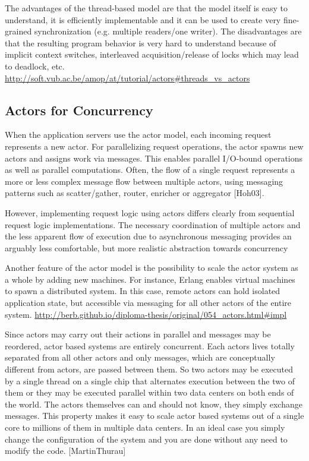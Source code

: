 The advantages of the thread-based model are that the model itself is easy to understand, it is efficiently implementable and it can be used to create very fine-grained synchronization (e.g. multiple readers/one writer). The disadvantages are that the resulting program behavior is very hard to understand because of implicit context switches, interleaved acquisition/release of locks which may lead to deadlock, etc. \url{http://soft.vub.ac.be/amop/at/tutorial/actors#threads_vs_actors}

\subsection{Actors for Concurrency}
When the application servers use the actor model, each incoming request represents a new actor. For parallelizing request operations, the actor spawns new actors and assigns work via messages. This enables parallel I/O-bound operations as well as parallel computations. Often, the flow of a single request represents a more or less complex message flow between multiple actors, using messaging patterns such as scatter/gather, router, enricher or aggregator [Hoh03].

However, implementing request logic using actors differs clearly from sequential request logic implementations. The necessary coordination of multiple actors and the less apparent flow of execution due to asynchronous messaging provides an arguably less comfortable, but more realistic abstraction towards concurrency

Another feature of the actor model is the possibility to scale the actor system as a whole by adding new machines. For instance, Erlang enables virtual machines to spawn a distributed system. In this case, remote actors can hold isolated application state, but accessible via messaging for all other actors of the entire system. \url{http://berb.github.io/diploma-thesis/original/054_actors.html#impl}

Since actors may carry out their actions in parallel and messages may be reordered, actor based systems are entirely concurrent. Each actors lives totally separated from all other actors and only messages, which are conceptually different from actors, are passed between them. So two actors may be executed by a single thread on a single chip that alternates execution between the two of them or they may be executed parallel within two data centers on both ends of the world. The actors themselves can and should not know, they simply exchange messages. This property makes it easy to scale actor based systems out of a single core to millions of them in multiple data centers. In an ideal case you simply change the configuration of the system and you are done without any need to modify the code. [MartinThurau]


